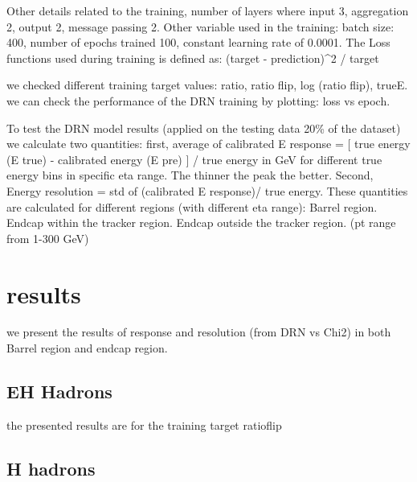 Other details related to the training, number of layers where input 3, aggregation 2, output 2, message passing 2. Other variable used in the training: batch size: 400, number of epochs trained 100, constant learning rate of 0.0001. The Loss functions used during training is defined as: (target - prediction)^2 / target

we checked different training target values: ratio, ratio flip, log (ratio flip), trueE.  
we can check the performance of the DRN training by plotting: loss vs epoch.

To test the DRN model results (applied on the testing data 20\% of the dataset) we calculate two quantities: first, average of calibrated E response = [ true energy (E true) - calibrated energy (E pre) ] / true energy in GeV for different true energy bins in specific eta range. The thinner the peak the better. 
Second, Energy resolution = std of (calibrated E response)/ true energy. These quantities are calculated for different regions (with different eta range): Barrel region. Endcap within the tracker region. Endcap outside the tracker region. (pt range from 1-300 GeV)  


\section{results}
we present the results of response and resolution (from DRN vs Chi2) in  both Barrel region and endcap region.

\subsection{EH Hadrons}
the presented results are for the training target ratioflip





\subsection{H hadrons}




